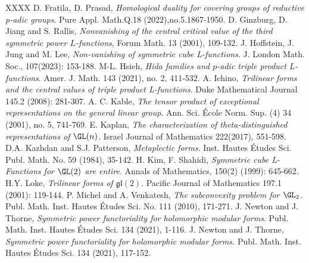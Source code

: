 \documentclass[11pt,reqno]{amsart}
\theoremstyle{plain}
\theoremstyle{remark} \newtheorem{remark}[thm]{Remark}
\theoremstyle{definition} \newtheorem{exercise}[thm]{Exercise}
\theoremstyle{definition} \newtheorem{example}[thm]{Example} \newtheorem{condition}[thm]{Condition}
\numberwithin{equation}{section}
\renewcommand{\-}{\text{--}}
\begin{document}
\begin{thebibliography}{XXXX}
D. Fratila, D. Prasad,\emph{
Homological duality for covering groups of reductive p-adic groups}.
Pure Appl. Math.Q.18 (2022),no.5.1867-1950.
 D. Ginzburg, D. Jiang and S. Rallis, \emph{Nonvanishing of the central critical value of the third
symmetric power $L$-functions}, Forum Math. 13 (2001), 109-132.
J. Hoffstein, J. Jung and M. Lee, \emph{Non-vanishing of symmetric cube 
L-functions}. J. London Math. Soc., 107(2023): 153-188.
M-L. Hsieh, \emph{Hida families and $p$-adic triple product $L$-functions}. 
Amer. J. Math. 143 (2021), no. 2, 411-532.
A. Ichino, \emph{Trilinear forms and the central values of triple product L-functions}. Duke Mathematical Journal 145.2 (2008): 281-307.
A. C. Kable, \emph{
The tensor product of exceptional representations on the general linear group}. Ann. Sci. École Norm. Sup. (4) 34 (2001), no. 5, 
741-769.
 E. Kaplan, {\em The characterization
of theta-distinguished representations of $\GL(n)$}.
Israel Journal of Mathematics 222(2017), 551-598.
 D.A. Kazhdan and S.J. Patterson, \emph{Metaplectic forms}.
Inst. Hautes Études Sci. Publ. Math. No. 59 (1984), 35-142.
H. Kim, F. Shahidi, \emph{ Symmetric cube L-Functions for $\GL(2)$ are entire}. Annals of Mathematics, 150(2) (1999): 645-662. 
H.Y. Loke, \emph{Trilinear forms of $\mathfrak{gl(2)}$}. Pacific Journal of Mathematics 197.1 (2001): 119-144.
P. Michel and A. Venkatesh, \emph{The subconvexity problem for $\GL_2$}.  Publ. Math. Inst. Hautes \'Etudes Sci. No. 111 (2010), 171-271.
 J. Newton and J. Thorne, {\em Symmetric power functoriality for holomorphic modular forms}. Publ. Math. Inst. Hautes \'Etudes Sci. 134 (2021), 1-116.
 J. Newton and J. Thorne, {\em Symmetric power functoriality for holomorphic modular forms.} Publ. Math. Inst. Hautes \'Etudes Sci. 134 (2021), 117-152.


\end{thebibliography}
\end{document}

